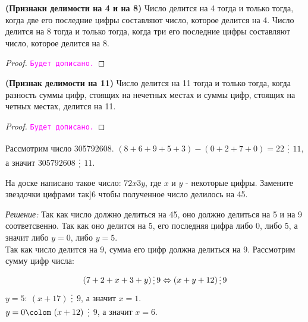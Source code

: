 \documentclass[11pt]{article}
\begin{document}
\begin{theorem} \textbf{(Признаки делимости на 4 и на 8)}
	Число делится на 4 тогда и только тогда, когда две его последние цифры составляют число, которое делится на 4. Число делится на 8 тогда и только тогда, когда три его последние цифры составляют число, которое делится на 8.
\end{theorem}
\begin{proof}
    \textcolor{magenta}{\texttt{Будет дописано.}}
\end{proof}
\begin{theorem} \textbf{(Признак делимости на 11)}
    Число делится на 11 тогда и только тогда, когда разность суммы цифр, стоящих на нечетных местах и суммы цифр, стоящих на четных местах, делится на 11.
\end{theorem}
\begin{proof}
    \textcolor{magenta}{\texttt{Будет дописано.}}
\end{proof}

\begin{example}
	Рассмотрим число 305792608. $(8 + 6 + 9 + 5 + 3) - (0 + 2 + 7 + 0) = 22$ $\divisible$ $11$, а значит $305792608$ $\divisible$ $11$.
\end{example}

\begin{example}

	На доске написано  такое число: $72x3y$, где $x$ и $y$ - некоторые цифры. Замените звездочки цифрами так]6 чтобы полученное число делилось на 45.

\end{example}
\textit{Решение:}
Так как число должно делиться на 45, оно должно делиться на 5 и на 9 соответсвенно.
Так как оно делится на 5, его последняя цифра либо 0, либо 5, а значит либо $y = 0$, либо $y = 5$. \\
Так как число делится на 9, сумма его цифр должна делиться на 9. Рассмотрим сумму цифр числа:
\[ (7 + 2 + x + 3 + y) \divisible 9 \Leftrightarrow (x + y + 12) \divisible 9\]
$y = 5\colon \ (x + 17)$ $\divisible$ $9$, а значит $x = 1$.\\
$y = 0\colom \ (x + 12)$ $\divisible$ $9$, а значит $x = 6$.\\
\end{document}
